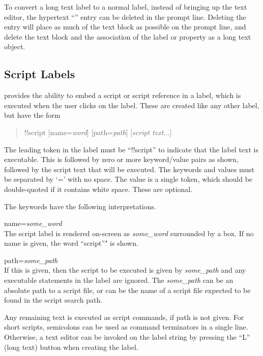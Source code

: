 To convert a long text label to a normal label, instead of bringing up
the text editor, the hypertext ``{\vt [text]}'' entry can be deleted
in the prompt line.  Deleting the entry will place as much of the text
block as possible on the prompt line, and delete the text block and
the association of the label or property as a long text object.

\subsection{Script Labels}

{\Xic} provides the ability to embed a script or script reference in a
label, which is executed when the user clicks on the label.  These are
created like any other label, but have the form

\begin{quote}\vt
!!script [name={\it word\/}] [path={\it path\/}] [{\it script text}...]
\end{quote}

The leading token in the label must be ``{\vt !!script}'' to indicate
that the label text is executable.  This is followed by zero or more
keyword/value pairs as shown, followed by the script text that will be
executed.  The keywords and values must be separated by `=' with no
space.  The value is a single token, which should be double-quoted if
it contains white space.  These are optional.

The keywords have the following interpretations.
\begin{description}
\item{\vt name={\it some\_word}}\\
The script label is rendered on-screen as {\it some\_word} surrounded
by a box.  If no name is given, the word ``{\vt script}''" is shown.

\item{\vt path={\it some\_path}}\\
If this is given, then the script to be executed is given by {\it
some\_path} and any executable statements in the label are ignored. 
The {\it some\_path} can be an absolute path to a script file, or can
be the name of a script file expected to be found in the script search
path.
\end{description}

Any remaining text is executed as script commands, if {\vt path} is
not given.  For short scripts, semicolons can be used as command
terminators in a single line.  Otherwise, a text editor can be invoked
on the label string by pressing the ``L'' (long text) button when
creating the label.

